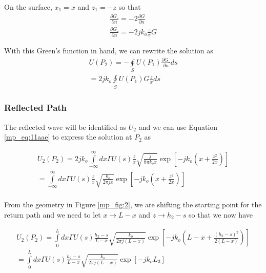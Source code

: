 On the surface, $x_1 = x$ and $z_1 = -z$ so that
\begin{equation}
\begin{gathered}
\frac{\partial G\_}{\partial n} = -2\frac{\partial G}{\partial n} \\
\frac{\partial G\_}{\partial n} = -2jk_o\frac{z}{x}G
\end{gathered}
\label{mp_eq:11aad}
\end{equation}
\renewcommand{\baselinestretch}{2} \small\normalsize

With this Green's function in hand, we can rewrite the solution as
\begin{equation}
\begin{gathered}
U(P_2) = -\oint\limits_{S}U(P_1)\frac{\partial G\_}{\partial n}ds\\
= 2jk_o\oint\limits_{S}U(P_1)G\frac{z}{x}ds
\end{gathered}
\label{mp_eq:11aae}
\end{equation}
\renewcommand{\baselinestretch}{2} \small\normalsize

\subsubsection{Reflected Path}
The reflected wave will be identified as $U_2$ and we can use Equation \ref{mp_eq:11aae} to express the solution at $P_2$ as

\begin{equation}
\begin{gathered}
U_2(P_2) = 2jk_o\int\limits_{-\infty}^{\infty}dx\Gamma U(s)\frac{z}{x}\sqrt{\frac{j}{8\pi k_o x}}\exp\left[-jk_o\left(x +\frac{z^2}{2x} \right) \right] \\
= \int\limits_{-\infty}^{\infty}dx\Gamma U(s)\frac{z}{x}\sqrt{\frac{k_o}{2\pi j x}}\exp\left[-jk_o\left(x +\frac{z^2}{2x} \right) \right] \\
\end{gathered}
\label{mp_eq:11aaf}
\end{equation}
\renewcommand{\baselinestretch}{2} \small\normalsize

From the geometry in Figure \ref{mp_fig:2}, we are shifting the starting point for the return path and we need to let $x \rightarrow L-x$ and $z \rightarrow h_2-s$ so that we now have

\begin{equation}
\begin{gathered}
U_2(P_2) = \int\limits_{0}^{L}dx\Gamma U(s)\frac{h_2-s}{L-x}\sqrt{\frac{k_o}{2\pi j (L-x)}}\exp\left[-jk_o\left(L-x +\frac{(h_2-s)^2}{2(L-x)} \right) \right] \\
= \int\limits_{0}^{L}dx\Gamma U(s)\frac{h_2-s}{L-x}\sqrt{\frac{k_o}{2\pi j (L-x)}}\exp\left[-jk_oL_3\right] \\
\end{gathered}
\label{mp_eq:11aag}
\end{equation}
\renewcommand{\baselinestretch}{2} \small\normalsize

